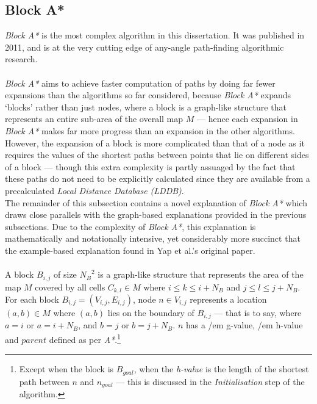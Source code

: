 \documentclass[12pt,notitlepage]{report}
\begin{document}
\subsection {Block A*}

\noindent
{\em Block A*} is the most complex algorithm in this dissertation. It was published in 2011, and is at the very cutting edge of any-angle path-finding algorithmic research.\\

\\
\noindent
{\em Block A*} aims to achieve faster computation of paths by doing far fewer expansions than the algorithms so far considered, because {\em Block A*} expands `blocks' rather than just nodes, where a block is a graph-like structure that represents an entire sub-area of the overall map $M$ --- hence each expansion in {\em Block A*} makes far more progress than an expansion in the other algorithms. However, the expansion of a block is more complicated than that of a node as it requires the values of the shortest paths between points that lie on different sides of a block --- though this extra complexity is partly assuaged by the fact that these paths do not need to be explicitly calculated since they are available from a precalculated {\em Local Distance Database (LDDB)}.\\

\noindent
The remainder of this subsection contains a novel explanation of {\em Block A*} which draws close parallels with the graph-based explanations provided in the previous subsections. Due to the complexity of {\em Block A*}, this explanation is mathematically and notationally intensive, yet considerably more succinct that the example-based explanation found in Yap et al.'s original paper\cite{Yap11}.\\

\\
\noindent
A block $B_{i,j}$ of size ${N_{B}}^{2}$ is a graph-like structure that represents the area of the map $M$ covered by all cells $C_{k,l} \in M$ where $i \leq k \leq i+N_{B}$ and $j \leq l \leq j+N_{B}$.\\

\noindent
For each block $B_{i,j} = (V_{i,j},E_{i,j})$, node $n \in V_{i,j}$ represents a location $(a,b) \in M$ where $(a,b)$ lies on the boundary of $B_{i,j}$ --- that is to say, where $a=i$ or $a=i+N_{B}$, and $b=j$ or $b=j+N_{B}$. $n$ has a {/em g-value}, {/em h-value} and $parent$ defined as per {\em A*}.\footnote{Except when the block is $B_{goal}$, when the {\em h-value} is the length of the shortest path between $n$ and $n_{goal}$ --- this is discussed in the {\em Initialisation} step of the algorithm.}\\
\end{document}
